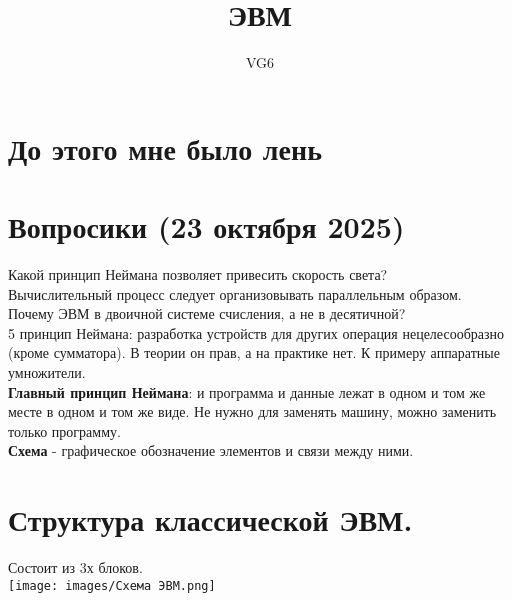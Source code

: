 \documentclass[12px]{article}
\title{ЭВМ}
\author{VG6}
\begin{document}
\maketitle

\section{До этого мне было лень}
\section*{Вопросики (23 октября 2025)}
Какой принцип Неймана позволяет привесить скорость света?\\
Вычислительный процесс следует организовывать параллельным образом.\\
Почему ЭВМ в двоичной системе счисления, а не в десятичной?\\
5 принцип Неймана: разработка устройств для других операция нецелесообразно (кроме сумматора). В теории он прав, а на практике нет. К примеру аппаратные умножители. \\
\textbf{Главный принцип Неймана}: и программа и данные лежат в одном и том же месте в одном и том же виде. Не нужно для заменять машину, можно заменить только программу. \\
\textbf{Схема} - графическое обозначение элементов и связи между ними. \\

\section{Структура классической ЭВМ.}
Состоит из 3х блоков.\\
\texttt{[image: images/Схема ЭВМ.png]}\\
\end{document}
